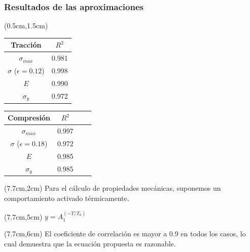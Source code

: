 \begin{frame}
 \frametitle{Resultados de las aproximaciones}
 \begin{textblock*}{6cm}(0.5cm,1.5cm) 
    
    \begin{table}[htp]
    \begin{center}
    \begin{tabular}{c c}
    \hline
    \textbf{Tracci\'on} & $R^{2}$ \\ \hline \hline
    $\sigma_{max}$ &  0.981 \\ \hline
    $\sigma$ ($\epsilon=0.12$) & 0.998 \\ \hline
    $E$ & 0.990 \\ \hline
    $\sigma_{y}$ &  0.972 \\ \hline
    \end{tabular}
    \end{center}
    \end{table}

    \begin{table}[htp]
    \begin{center}
    \begin{tabular}{*{4}{c}}
    \hline
    \textbf{Compresi\'on} & $R^{2}$ \\ \hline \hline
    $\sigma_{max}$ & 0.997 \\ \hline
    $\sigma$ ($\epsilon=0.18$) & 0.972 \\ \hline
    $E$ & 0.985 \\ \hline
    $\sigma_{y}$ & 0.985 \\ \hline
    \end{tabular}
    \end{center}
    \end{table}
 \end{textblock*}
  \begin{textblock*}{4.8cm}(7.7cm,2cm)
  \centering
   Para el c\'alculo de propiedades mec\'anicas, suponemos un comportamiento activado t\'ermicamente.
   \end{textblock*}
   \begin{textblock*}{4.8cm}(7.7cm,5cm)
   \centering
    $y=A_1^{(-T/T_0)}$
    \end{textblock*}
  \begin{textblock*}{4.8cm}(7.7cm,6cm)
  \centering
   El coeficiente de correlaci\'on es mayor a 0.9 en todos los casos, lo cual demuestra que la ecuaci\'on propuesta es razonable.
  \end{textblock*}
\end{frame}

